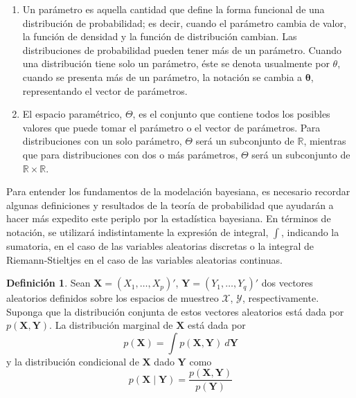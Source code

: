 \documentclass[
  10pt,
  spanish,
]{book}
\providecommand{\tightlist}{%
  \setlength{\itemsep}{0pt}\setlength{\parskip}{0pt}}
\theoremstyle{definition}
\newtheorem{definition}{Definición}[chapter]
\theoremstyle{definition}
\theoremstyle{definition}
\theoremstyle{definition}
\theoremstyle{remark}
\begin{document}
\begin{enumerate}
\def\labelenumi{\arabic{enumi}.}
\tightlist
\item
  Un parámetro es aquella cantidad que define la forma funcional de una distribución de probabilidad; es decir, cuando el parámetro cambia de valor, la función de densidad y la función de distribución cambian. Las distribuciones de probabilidad pueden tener más de un parámetro. Cuando una distribución tiene solo un parámetro, éste se denota usualmente por \(\theta\), cuando se presenta más de un parámetro, la notación se cambia a \(\boldsymbol \theta\), representando el vector de parámetros.
\item
  El espacio paramétrico, \(\Theta\), es el conjunto que contiene todos los posibles valores que puede tomar el parámetro o el vector de parámetros. Para distribuciones con un solo parámetro, \(\Theta\) será un subconjunto de \(\mathbb{R}\), mientras que para distribuciones con dos o más parámetros, \(\Theta\) será un subconjunto de \(\mathbb{R}\times\mathbb{R}\).
\end{enumerate}

Para entender los fundamentos de la modelación bayesiana, es necesario
recordar algunas definiciones y resultados de la teoría de probabilidad
que ayudarán a hacer más expedito este periplo por la estadística
bayesiana. En términos de notación, se utilizará indistintamente la
expresión de integral, \(\int\), indicando la sumatoria, en el caso de las
variables aleatorias discretas o la integral de Riemann-Stieltjes en el
caso de las variables aleatorias continuas.

\begin{definition}
\protect\hypertarget{def:unnamed-chunk-4}{}{\label{def:unnamed-chunk-4} }Sean \(\mathbf{X}=(X_1,\ldots,X_p)'\), \(\mathbf{Y}=(Y_1,\ldots,Y_q)'\) dos vectores aleatorios definidos sobre los espacios de muestreo \(\mathcal{X}\), \(\mathcal{Y}\), respectivamente. Suponga que la distribución conjunta de estos vectores aleatorios está dada por \(p(\mathbf{X},\mathbf{Y})\). La distribución marginal de \(\mathbf{X}\) está dada por
\begin{equation}
p(\mathbf{X})=\int p(\mathbf{X},\mathbf{Y})\ d\mathbf{Y}
\end{equation}
y la distribución condicional de \(\mathbf{X}\) dado \(\mathbf{Y}\) como
\begin{equation}
p(\mathbf{X} \mid \mathbf{Y})
=\frac{p(\mathbf{X},\mathbf{Y})}{p(\mathbf{Y})}
\end{equation}
\end{definition}
\end{document}
